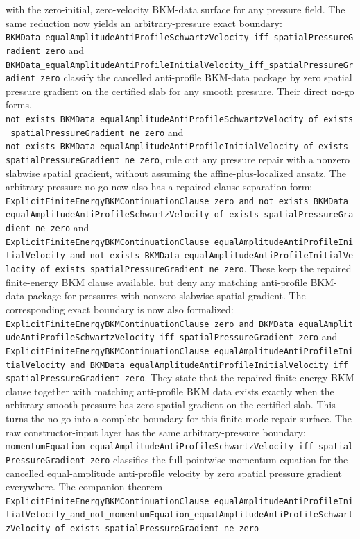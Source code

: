\documentclass[11pt]{article}
\theoremstyle{remark}
\begin{document}
with the zero-initial, zero-velocity BKM-data surface for any pressure field.
The same reduction now yields an arbitrary-pressure exact boundary:
\texttt{BKMData\_equalAmplitudeAntiProfileSchwartzVelocity\_iff\_spatialPressureGradient\_zero}
and
\texttt{BKMData\_equalAmplitudeAntiProfileInitialVelocity\_iff\_spatialPressureGradient\_zero}
classify the cancelled anti-profile BKM-data package by zero spatial pressure
gradient on the certified slab for any smooth pressure.  Their direct no-go
forms,
\texttt{not\_exists\_BKMData\_equalAmplitudeAntiProfileSchwartzVelocity\_of\_exists\_spatialPressureGradient\_ne\_zero}
and
\texttt{not\_exists\_BKMData\_equalAmplitudeAntiProfileInitialVelocity\_of\_exists\_spatialPressureGradient\_ne\_zero},
rule out any pressure repair with a nonzero slabwise spatial gradient, without
assuming the affine-plus-localized ansatz.
The arbitrary-pressure no-go now also has a repaired-clause separation form:
\texttt{ExplicitFiniteEnergyBKMContinuationClause\_zero\_and\_not\_exists\_BKMData\_equalAmplitudeAntiProfileSchwartzVelocity\_of\_exists\_spatialPressureGradient\_ne\_zero}
and
\texttt{ExplicitFiniteEnergyBKMContinuationClause\_equalAmplitudeAntiProfileInitialVelocity\_and\_not\_exists\_BKMData\_equalAmplitudeAntiProfileInitialVelocity\_of\_exists\_spatialPressureGradient\_ne\_zero}.
These keep the repaired finite-energy BKM clause available, but deny any
matching anti-profile BKM-data package for pressures with nonzero slabwise
spatial gradient.
The corresponding exact boundary is now also formalized:
\texttt{ExplicitFiniteEnergyBKMContinuationClause\_zero\_and\_BKMData\_equalAmplitudeAntiProfileSchwartzVelocity\_iff\_spatialPressureGradient\_zero}
and
\texttt{ExplicitFiniteEnergyBKMContinuationClause\_equalAmplitudeAntiProfileInitialVelocity\_and\_BKMData\_equalAmplitudeAntiProfileInitialVelocity\_iff\_spatialPressureGradient\_zero}.
They state that the repaired finite-energy BKM clause together with matching
anti-profile BKM data exists exactly when the arbitrary smooth pressure has
zero spatial gradient on the certified slab.  This turns the no-go into a
complete boundary for this finite-mode repair surface.
The raw constructor-input layer has the same arbitrary-pressure boundary:
\texttt{momentumEquation\_equalAmplitudeAntiProfileSchwartzVelocity\_iff\_spatialPressureGradient\_zero}
classifies the full pointwise momentum equation for the cancelled
equal-amplitude anti-profile velocity by zero spatial pressure gradient
everywhere.  The companion theorem
\texttt{ExplicitFiniteEnergyBKMContinuationClause\_equalAmplitudeAntiProfileInitialVelocity\_and\_not\_momentumEquation\_equalAmplitudeAntiProfileSchwartzVelocity\_of\_exists\_spatialPressureGradient\_ne\_zero}
\end{document}
